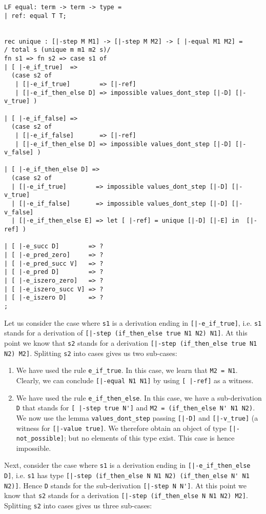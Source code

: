 \begin{lstlisting}
LF equal: term -> term -> type =
| ref: equal T T;


rec unique : [|-step M M1] -> [|-step M M2] -> [ |-equal M1 M2] =
/ total s (unique m m1 m2 s)/
fn s1 => fn s2 => case s1 of
| [ |-e_if_true]  =>
  (case s2 of
   | [|-e_if_true]        => [|-ref]
   | [|-e_if_then_else D] => impossible values_dont_step [|-D] [|-v_true] )

| [ |-e_if_false] =>
  (case s2 of
   | [|-e_if_false]       => [|-ref]
   | [|-e_if_then_else D] => impossible values_dont_step [|-D] [|-v_false] )

| [ |-e_if_then_else D] =>
  (case s2 of
  | [|-e_if_true]        => impossible values_dont_step [|-D] [|-v_true]
  | [|-e_if_false]       => impossible values_dont_step [|-D] [|-v_false]
  | [|-e_if_then_else E] => let [ |-ref] = unique [|-D] [|-E] in  [|-ref] )

| [ |-e_succ D]        => ?
| [ |-e_pred_zero]     => ?
| [ |-e_pred_succ V]   => ?
| [ |-e_pred D]        => ?
| [ |-e_iszero_zero]   => ?
| [ |-e_iszero_succ V] => ?
| [ |-e_iszero D]      => ?
;
\end{lstlisting}

Let us consider the case where \lstinline!s1! is a derivation ending in
\lstinline![|-e_if_true]!, i.e. \lstinline!s1! stands for a derivation of
\lstinline![|-step (if_then_else true N1 N2) N1]!. At this point we know that \lstinline!s2! stands
for a derivation \lstinline![|-step (if_then_else true N1 N2) M2]!. Splitting
\lstinline!s2! into cases gives us two sub-cases:
\begin{enumerate}
\item We have used the rule
\lstinline!e_if_true!. In this case, we learn that
\lstinline!M2 = N1!. Clearly, we can conclude \lstinline![|-equal N1 N1]! by
using \lstinline![ |-ref]! as a witness.

\item We have used the rule \lstinline!e_if_then_else!. In this case, we have a
  sub-derivation \lstinline!D! that stands for \lstinline![ |-step true N']! and \lstinline!M2 = (if_then_else N' N1 N2)!.
We now use the lemma \lstinline!values_dont_step! passing \lstinline![|-D]! and \lstinline![|-v_true]! (a witness
for \lstinline![|-value true]!.
We therefore obtain an object of type \lstinline![|-not_possible]!; but no
elements of this type exist. This case is hence impossible.
\end{enumerate}

Next, consider the case where \lstinline!s1! is a derivation ending in
\lstinline![|-e_if_then_else D]!, i.e. \lstinline!s1! has type
\lstinline![|-step (if_then_else N N1 N2) (if_then_else N' N1 N2)]!. Hence \lstinline!D! stands for the sub-derivation
\lstinline![|-step N N']!. At this point we know that \lstinline!s2! stands
for a derivation \lstinline![|-step (if_then_else N N1 N2) M2]!. Splitting
\lstinline!s2! into cases gives us three sub-cases:

